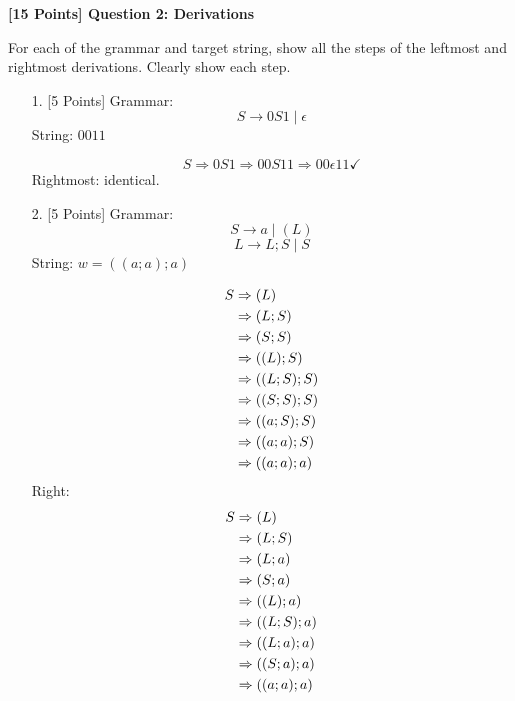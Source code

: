 \documentclass[12pt]{article}
\begin{document}
\newpage

\noindent\textbf{[15 Points] Question 2: Derivations}

\noindent For each of the grammar and target string, show all the steps of the leftmost and rightmost derivations. Clearly show each step.

\vspace{1em}

\begin{enumerate}[label=\arabic*.]
    \item[1.] [5 Points] Grammar: 
    \[
        S \rightarrow 0S1 \mid \epsilon
    \]
    String: $0011$
    
\begin{equation}
  S \Rightarrow 0S1 \Rightarrow 00S11 \Rightarrow 00\epsilon11 \checkmark
\end{equation}
Rightmost: identical.
    
    \item[2.] [5 Points] Grammar:
    \[
        S \rightarrow a \mid (L)
    \]
    \[
        L \rightarrow L;S \mid S
    \]
    String: $w = ((a; a); a)$
    
\begin{align}
S &\Rightarrow (L) \notag\\
  &\Rightarrow (L;S) \notag\\
  &\Rightarrow (S;S) \notag\\
  &\Rightarrow ((L);S) \notag\\
  &\Rightarrow ((L;S);S) \notag\\
  &\Rightarrow ((S;S);S) \notag\\
  &\Rightarrow ((a;S);S) \notag\\
  &\Rightarrow ((a;a);S) \notag\\
  &\Rightarrow ((a;a);a)
\end{align}
Right: 
\begin{align}
S &\Rightarrow (L) \notag\\
  &\Rightarrow (L;S) \notag\\
  &\Rightarrow (L;a) \notag\\
  &\Rightarrow (S;a) \notag\\
  &\Rightarrow ((L);a) \notag\\
  &\Rightarrow ((L;S);a) \notag\\
  &\Rightarrow ((L;a);a) \notag\\
  &\Rightarrow ((S;a);a) \notag\\
  &\Rightarrow ((a;a);a)
\end{align}




\end{enumerate}
\end{document}

